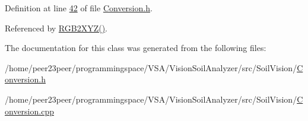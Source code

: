 Definition at line \hyperlink{_conversion_8h_source_l00042}{42} of file \hyperlink{_conversion_8h_source}{Conversion.\+h}.



Referenced by \hyperlink{_conversion_8cpp_source_l00207}{R\+G\+B2\+X\+Y\+Z()}.



The documentation for this class was generated from the following files\+:\begin{DoxyCompactItemize}
\item 
/home/peer23peer/programmingspace/\+V\+S\+A/\+Vision\+Soil\+Analyzer/src/\+Soil\+Vision/\hyperlink{_conversion_8h}{Conversion.\+h}\item 
/home/peer23peer/programmingspace/\+V\+S\+A/\+Vision\+Soil\+Analyzer/src/\+Soil\+Vision/\hyperlink{_conversion_8cpp}{Conversion.\+cpp}\end{DoxyCompactItemize}
